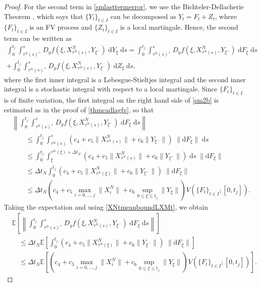 \documentclass[reqno,12pt]{amsart}
\theoremstyle{plain} %
\theoremstyle{definition} %
\begin{document}
\begin{proof}
    For the second term in \eqref{smlasttermerror}, we use the Bichteler-Dellacherie Theorem \cite[Theorem III.47]{Protter2005}, which says that $\{Y_t\}_{t\in I}$ can be decomposed as $Y_t = F_t + Z_t$, where $\{F_t\}_{t\in I}$ is an FV process and $\{Z_t\}_{t\in I}$ is a local martingale. Hence, the second term can be written as
    \begin{multline}
        \label{sm2b}
        \int_0^{t_j} \int_{\tau^N(s)^+}^s D_y f(\xi, X_{\tau^N(s)}^N, Y_{\xi^-}) \;\mathrm{d}Y_\xi \;\mathrm{d}s = \int_0^{t_j} \int_{\tau^N(s)^+}^s D_y f(\xi, X_{\tau^N(s)}^N, Y_{\xi^-}) \;\mathrm{d}F_\xi \;\mathrm{d}s \\  
        + \int_0^{t_j} \int_{\tau^N(s)^+}^s D_y f(\xi, X_{\tau^N(s)}^N, Y_{\xi^-}) \;\mathrm{d}Z_\xi \;\mathrm{d}s,
    \end{multline}
    where the first inner integral is a Lebesgue-Stieltjes integral and the second inner integral is a stochastic integral with respect to a local martingale. Since $\{F_t\}_{t\in I}$ is of finite variation, the first integral on the right hand side of \eqref{sm2b} is estimated as in the proof of \cref{thmcadlagfv}, so that
    \begin{align*}
        & \left\|\int_0^{t_j} \int_{\tau^N(s)^+}^s D_y f(\xi, X_{\tau^N(s)}^N, Y_{\xi^-}) \;\mathrm{d}F_\xi\;\mathrm{d}s\right\| \\
        & \qquad \leq \int_0^{t_j} \int_{\tau^N(s)}^s \left(c_4 + c_5 \|X_{\tau^N(s)}^N\| + c_6\|Y_{\xi^-}\|\right)\;\|\mathrm{d}F_\xi\|\;\mathrm{d}s \\
        & \qquad \leq \int_0^{t_j} \int_{\xi}^{\tau^N(\xi) + \Delta t_N} \left(c_4 + c_5 \|X_{\tau^N(s)}^N\| + c_6\|Y_{\xi^-}\|\right)\;\mathrm{d}s\;\|\mathrm{d}F_\xi\| \\
        & \qquad \leq \Delta t_N\int_0^{t_j} \left(c_4 + c_5 \|X_{\tau^N(\xi)}^N\| + c_6\|Y_{\xi^-}\|\right)\;\|\mathrm{d}F_\xi\| \\
        & \qquad \leq \Delta t_N\left(c_4 + c_5 \max_{i=0, \ldots, j}\|X_{i}^N\| + c_6\sup_{0\leq \xi \leq t_j}\|Y_{\xi}\|\right)V(\{F_t\}_{t\in I}; [0, t_j]).
    \end{align*}
    Taking the expectation and using \eqref{XNtmeanboundLXMt}, we obtain
    \begin{align*}
        & \mathbb{E}\left[\left\|\int_0^{t_j} \int_{\tau^N(s)^+}^s D_y f(\xi, X_{\tau^N(s)}^N, Y_{\xi^-}) \;\mathrm{d}F_\xi\;\mathrm{d}s\right\|\right] \\
        & \quad \leq \Delta t_N\mathbb{E}\left[\int_0^{t_j} \left(c_4 + c_5 \|X_{\tau^N(\xi)}^N\| + c_6\|Y_{\xi^-}\|\right)\;\|\mathrm{d}F_\xi\|\right] \\
        & \quad \leq \Delta t_N\mathbb{E}\left[\left(c_4 + c_5 \max_{i=0, \ldots, j}\|X_{i}^N\| + c_6\sup_{0\leq \xi \leq t_j}\|Y_{\xi}\|\right)V(\{F_t\}_{t\in I}; [0, t_j])\right].
    \end{align*}
    

\end{proof}
\end{document}
